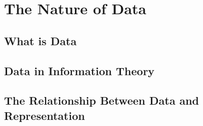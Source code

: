 \chapter{The Nature of Data}
\section{What is Data}
\section{Data in Information Theory}
\section{The Relationship Between Data and Representation}
